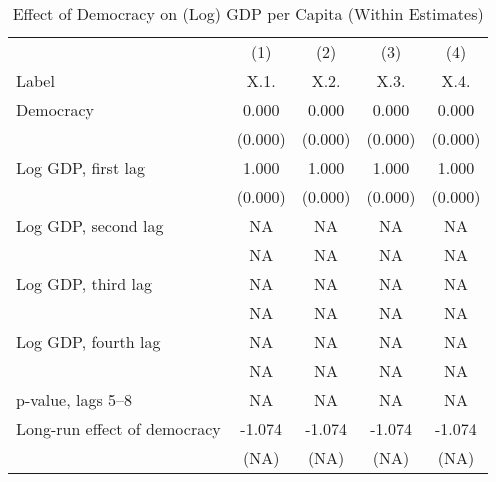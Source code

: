 \begin{table}[!h]
\centering
\caption{\label{tab:tab:withinFE}Effect of Democracy on (Log) GDP per Capita (Within Estimates)}
\centering
\begin{tabular}[t]{lcccc}
\toprule
\multicolumn{1}{c}{ } & \multicolumn{1}{c}{(1)} & \multicolumn{1}{c}{(2)} & \multicolumn{1}{c}{(3)} & \multicolumn{1}{c}{(4)} \\
\cmidrule(l{3pt}r{3pt}){2-2} \cmidrule(l{3pt}r{3pt}){3-3} \cmidrule(l{3pt}r{3pt}){4-4} \cmidrule(l{3pt}r{3pt}){5-5}
Label & X.1. & X.2. & X.3. & X.4.\\
\midrule
Democracy & 0.000 & 0.000 & 0.000 & 0.000\\
 & (0.000) & (0.000) & (0.000) & (0.000)\\
Log GDP, first lag & 1.000 & 1.000 & 1.000 & 1.000\\
 & (0.000) & (0.000) & (0.000) & (0.000)\\
Log GDP, second lag & NA & NA & NA & NA\\
\addlinespace
 & NA & NA & NA & NA\\
Log GDP, third lag & NA & NA & NA & NA\\
 & NA & NA & NA & NA\\
Log GDP, fourth lag & NA & NA & NA & NA\\
 & NA & NA & NA & NA\\
\addlinespace
p-value, lags 5--8 & NA & NA & NA & NA\\
Long-run effect of democracy & -1.074 & -1.074 & -1.074 & -1.074\\
 & (NA) & (NA) & (NA) & (NA)\\
\bottomrule
\end{tabular}
\end{table}
